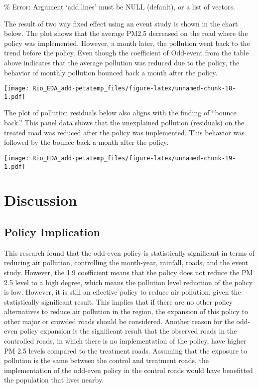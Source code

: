 \documentclass[
]{article}
\begin{document}
\% Error: Argument `add.lines' must be NULL (default), or a list of
vectors.

The result of two way fixed effect using an event study is shown in the
chart below. The plot shows that the average PM2.5 decreased on the road
where the policy was implemented. However, a month later, the pollution
went back to the trend before the policy. Even though the coefficient of
Odd-event from the table above indicates that the average pollution was
reduced due to the policy, the behavior of monthly pollution bounced
back a month after the policy.

\texttt{[image: Rio\_EDA\_add-petatemp\_files/figure-latex/unnamed-chunk-18-1.pdf]}

The plot of pollution residuals below also aligns with the finding of
``bounce back.'' This panel data shows that the unexplained pollution
(residuals) on the treated road was reduced after the policy was
implemented. This behavior was followed by the bounce back a month after
the policy.

\texttt{[image: Rio\_EDA\_add-petatemp\_files/figure-latex/unnamed-chunk-19-1.pdf]}

\hypertarget{discussion}{%
\section{Discussion}\label{discussion}}

\hypertarget{policy-implication}{%
\subsection{Policy Implication}\label{policy-implication}}

This research found that the odd-even policy is statistically
significant in terms of reducing air pollution, controlling the
month-year, rainfall, roads, and the event study. However, the 1.9
coefficient means that the policy does not reduce the PM 2.5 level to a
high degree, which means the pollution level reduction of the policy is
low. However, it is still an effective policy to reduce air pollution,
given the statistically significant result. This implies that if there
are no other policy alternatives to reduce air pollution in the region,
the expansion of this policy to other major or crowded roads should be
considered. Another reason for the odd-even policy expansion is the
significant result that the observed roads in the controlled roads, in
which there is no implementation of the policy, have higher PM 2.5
levels compared to the treatment roads. Assuming that the exposure to
pollution is the same between the control and treatment roads, the
implementation of the odd-even policy in the control roads would have
benefitted the population that lives nearby.
\end{document}
